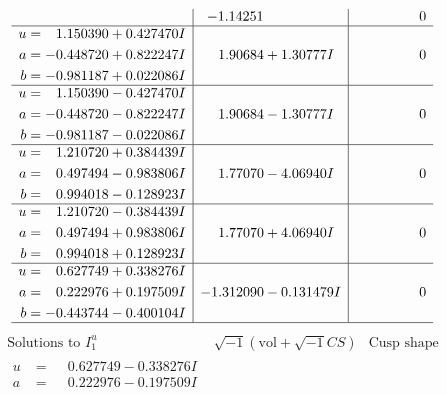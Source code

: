 \documentclass[1p]{elsarticle_modified}
\theoremstyle{definition}
\newcommand{\I}{\sqrt{-1}}
\begin{document}
$$\begin{array}{c|c|c}
 & -1.14251\phantom{ +0.000000I} & \phantom{-0.000000 } 0 \\ \hline\begin{aligned}
u &= \phantom{-}1.150390 + 0.427470 I \\
a &= -0.448720 + 0.822247 I \\
b &= -0.981187 + 0.022086 I\end{aligned}
 & \phantom{-}1.90684 + 1.30777 I & \phantom{-0.000000 } 0 \\ \hline\begin{aligned}
u &= \phantom{-}1.150390 - 0.427470 I \\
a &= -0.448720 - 0.822247 I \\
b &= -0.981187 - 0.022086 I\end{aligned}
 & \phantom{-}1.90684 - 1.30777 I & \phantom{-0.000000 } 0 \\ \hline\begin{aligned}
u &= \phantom{-}1.210720 + 0.384439 I \\
a &= \phantom{-}0.497494 - 0.983806 I \\
b &= \phantom{-}0.994018 - 0.128923 I\end{aligned}
 & \phantom{-}1.77070 - 4.06940 I & \phantom{-0.000000 } 0 \\ \hline\begin{aligned}
u &= \phantom{-}1.210720 - 0.384439 I \\
a &= \phantom{-}0.497494 + 0.983806 I \\
b &= \phantom{-}0.994018 + 0.128923 I\end{aligned}
 & \phantom{-}1.77070 + 4.06940 I & \phantom{-0.000000 } 0 \\ \hline\begin{aligned}
u &= \phantom{-}0.627749 + 0.338276 I \\
a &= \phantom{-}0.222976 + 0.197509 I \\
b &= -0.443744 - 0.400104 I\end{aligned}
 & -1.312090 - 0.131479 I & \phantom{-0.000000 } 0\\
 \hline 
 \end{array}$$\newpage$$\begin{array}{c|c|c}  
\text{Solutions to }I^u_{1}& \I (\text{vol} + \sqrt{-1}CS) & \text{Cusp shape}\\
 \hline 
\begin{aligned}
u &= \phantom{-}0.627749 - 0.338276 I \\
a &= \phantom{-}0.222976 - 0.197509 I \\

\end{aligned}
\end{array}$$
\end{document}

